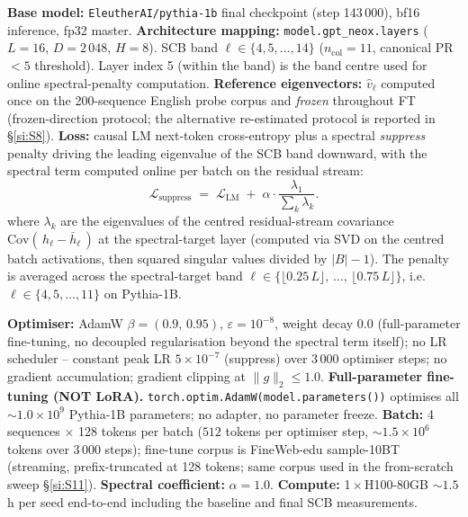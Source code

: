 \documentclass[11pt,a4paper]{article}
\begin{document}
\textbf{Base model:} \texttt{EleutherAI/pythia-1b} final checkpoint
(step 143\,000), bf16 inference, fp32 master.
\textbf{Architecture mapping:} \texttt{model.gpt\_neox.layers}
($L\!=\!16$, $D\!=\!2\,048$, $H\!=\!8$).
SCB band $\ell \in \{4, 5, \ldots, 14\}$ ($n_\mathrm{col} = 11$,
canonical PR$\!<\!5$ threshold). Layer index 5 (within the band) is
the band centre used for online spectral-penalty computation.
\textbf{Reference eigenvectors:} $\hat{v}_\ell$ computed once on
the 200-sequence English probe corpus and \emph{frozen}
throughout FT (frozen-direction protocol; the alternative
re-estimated protocol is reported in \S\ref{si:S8}).
\textbf{Loss:} causal LM next-token cross-entropy plus a spectral
\emph{suppress} penalty driving the leading eigenvalue of the SCB
band downward, with the spectral term computed online per batch on
the residual stream:
\begin{equation}
  \mathcal{L}_\mathrm{suppress} \;=\;
  \mathcal{L}_\mathrm{LM} \;+\; \alpha \cdot
  \frac{\lambda_1}{\sum_k \lambda_k}.
\end{equation}
where $\lambda_k$ are the eigenvalues of the centred residual-stream
covariance $\mathrm{Cov}(\,h_\ell\!-\!\bar h_\ell\,)$ at the
spectral-target layer (computed via SVD on the centred batch
activations, then squared singular values divided by $|B|\!-\!1$).
The penalty is averaged across the spectral-target band
$\ell\!\in\!\{\lfloor 0.25\,L\rfloor,\,\ldots,\,\lfloor 0.75\,L\rfloor\}$,
i.e.\ $\ell\!\in\!\{4,5,\ldots,11\}$ on Pythia-1B.

\textbf{Optimiser:} AdamW $\beta\!=\!(0.9,\,0.95)$, $\varepsilon\!=\!10^{-8}$,
weight decay $0.0$ (full-parameter fine-tuning, no decoupled regularisation
beyond the spectral term itself); no LR scheduler -- constant peak LR
$5\!\times\!10^{-7}$ (suppress) over 3\,000 optimiser steps; no
gradient accumulation; gradient clipping at $\|g\|_2\!\leq\!1.0$.
\textbf{Full-parameter fine-tuning (NOT LoRA).}
\texttt{torch.optim.AdamW(model.parameters())} optimises all
$\sim\!1.0\!\times\!10^9$ Pythia-1B parameters; no adapter, no
parameter freeze.
\textbf{Batch:} 4 sequences $\times$ 128 tokens per batch
($512$ tokens per optimiser step, $\sim\!1.5\!\times\!10^6$ tokens
over 3\,000 steps); fine-tune corpus is FineWeb-edu sample-10BT
(streaming, prefix-truncated at 128 tokens; same corpus used in
the from-scratch sweep \S\ref{si:S11}).
\textbf{Spectral coefficient:} $\alpha\!=\!1.0$. \textbf{Compute:}
1\,$\times$\,H100-80GB $\sim\!1.5$\,h per seed end-to-end including
the baseline and final SCB measurements.
\end{document}
